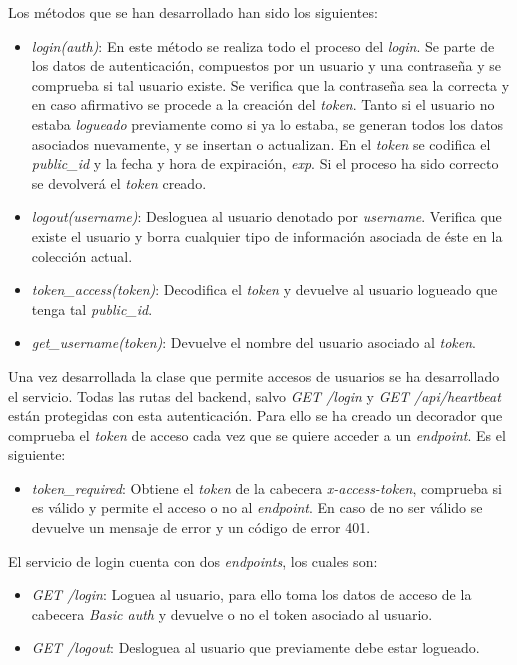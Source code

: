 \bigskip
Los métodos que se han desarrollado han sido los siguientes:
\begin{itemize}
	\item \textit{login(auth)}: En este método se realiza todo el proceso del \textit{login}. Se parte de los datos de autenticación, compuestos por un usuario y una contraseña y se comprueba si tal usuario existe. Se verifica que la contraseña sea la correcta y en caso afirmativo se procede a la creación del \textit{token}. Tanto si el usuario no estaba \textit{logueado} previamente como si ya lo estaba, se generan todos los datos asociados nuevamente, y se insertan o actualizan. En el \textit{token} se codifica el \textit{public\_id} y la fecha y hora de expiración, \textit{exp}. Si el proceso ha sido correcto se devolverá el \textit{token} creado.
	\item \textit{logout(username)}: Desloguea al usuario denotado por \textit{username}. Verifica que existe el usuario y borra cualquier tipo de información asociada de éste en la colección actual.
	\item \textit{token\_access(token)}: Decodifica el \textit{token} y devuelve al usuario logueado que tenga tal \textit{public\_id}.
	\item \textit{get\_username(token)}: Devuelve el nombre del usuario asociado al \textit{token}.
\end{itemize}


Una vez desarrollada la clase que permite accesos de usuarios se ha desarrollado el servicio. Todas las rutas del backend, salvo \textit{GET /login} y \textit{GET /api/heartbeat} están protegidas con esta autenticación. Para ello se ha creado un decorador que comprueba el \textit{token} de acceso cada vez que se quiere acceder a un \textit{endpoint}. Es el siguiente:
\begin{itemize}
	\item \textit{token\_required}: Obtiene el \textit{token} de la cabecera \textit{x-access-token}, comprueba si es válido y permite el acceso o no al \textit{endpoint}. En caso de no ser válido se devuelve un mensaje de error y un código de error 401.
\end{itemize}


\bigskip
El servicio de login cuenta con dos \textit{endpoints}, los cuales son:
\begin{itemize}
	\item \textit{GET /login}: Loguea al usuario, para ello toma los datos de acceso de la cabecera \textit{Basic auth} y devuelve o no el token asociado al usuario.
	\item \textit{GET /logout}: Desloguea al usuario que previamente debe estar logueado.
\end{itemize}




